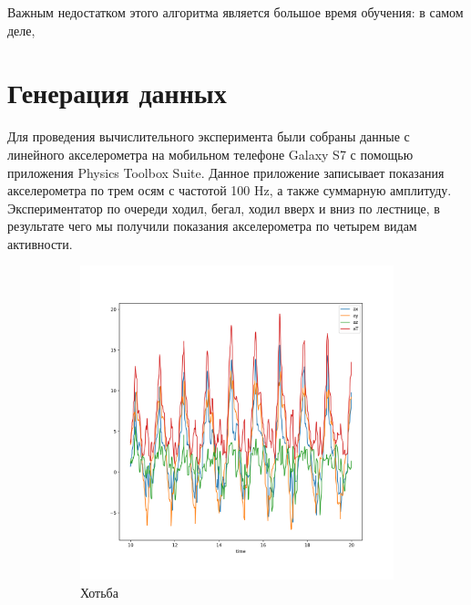 \documentclass[12pt, fleqn, unicode]{article}
\begin{document}
Важным недостатком этого алгоритма является большое время обучения:
в самом деле,

\newpage
\section{Генерация данных}

Для проведения вычислительного эксперимента были собраны данные с линейного
акселерометра на мобильном телефоне Galaxy S7 с помощью приложения
Physics Toolbox Suite. %
Данное приложение записывает показания акселерометра по трем осям с частотой 100 Hz,
а также суммарную амплитуду. Экспериментатор по очереди ходил, бегал, ходил вверх
и вниз по лестнице, в результате чего мы получили показания акселерометра по
четырем видам активности.

\begin{figure}
    \begin{subfigure}[b]{0.5\textwidth}
        \centering
        \includegraphics[width=.9\linewidth]{../pics/raw_walking.png}
        \caption{Хотьба}
        \label{fig:sfig1}
    \end{subfigure}
    \begin{subfigure}[b]{0.5\textwidth}
        \centering

\end{subfigure}
\end{figure}
\end{document}
